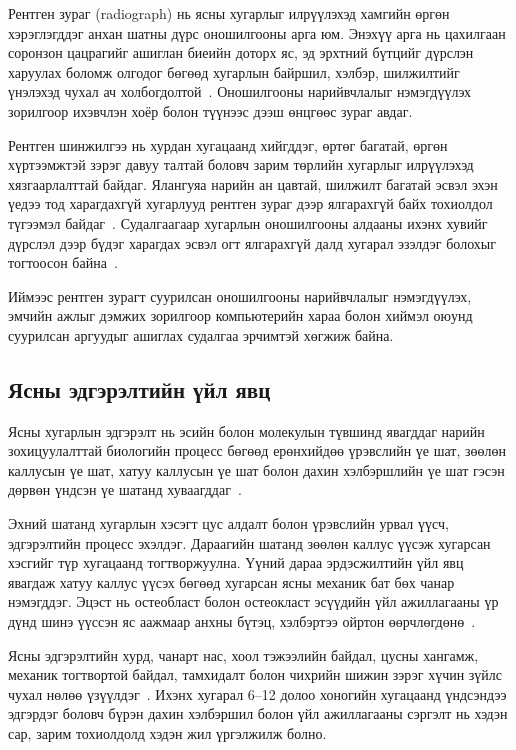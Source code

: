 Рентген зураг (radiograph) нь ясны хугарлыг илрүүлэхэд хамгийн өргөн хэрэглэгддэг анхан шатны дүрс оношилгооны арга юм. Энэхүү арга нь цахилгаан соронзон цацрагийг ашиглан биеийн доторх яс, эд эрхтний бүтцийг дүрслэн харуулах боломж олгодог бөгөөд хугарлын байршил, хэлбэр, шилжилтийг үнэлэхэд чухал ач холбогдолтой~\cite{ref09}. Оношилгооны нарийвчлалыг нэмэгдүүлэх зорилгоор ихэвчлэн хоёр болон түүнээс дээш өнцгөөс зураг авдаг.

Рентген шинжилгээ нь хурдан хугацаанд хийгддэг, өртөг багатай, өргөн хүртээмжтэй зэрэг давуу талтай боловч зарим төрлийн хугарлыг илрүүлэхэд хязгаарлалттай байдаг. Ялангуяа нарийн ан цавтай, шилжилт багатай эсвэл эхэн үедээ тод харагдахгүй хугарлууд рентген зураг дээр ялгарахгүй байх тохиолдол түгээмэл байдаг~\cite{ref10}. Судалгаагаар хугарлын оношилгооны алдааны ихэнх хувийг дүрслэл дээр бүдэг харагдах эсвэл огт ялгарахгүй далд хугарал эзэлдэг болохыг тогтоосон байна~\cite{ref26}.

Иймээс рентген зурагт суурилсан оношилгооны нарийвчлалыг нэмэгдүүлэх, эмчийн ажлыг дэмжих зорилгоор компьютерийн хараа болон хиймэл оюунд суурилсан аргуудыг ашиглах судалгаа эрчимтэй хөгжиж байна.

\subsection*{Ясны эдгэрэлтийн үйл явц}

Ясны хугарлын эдгэрэлт нь эсийн болон молекулын түвшинд явагддаг нарийн зохицуулалттай биологийн процесс бөгөөд ерөнхийдөө үрэвслийн үе шат, зөөлөн каллусын үе шат, хатуу каллусын үе шат болон дахин хэлбэршлийн үе шат гэсэн дөрвөн үндсэн үе шатанд хуваагддаг~\cite{ref27}.

Эхний шатанд хугарлын хэсэгт цус алдалт болон үрэвслийн урвал үүсч, эдгэрэлтийн процесс эхэлдэг. Дараагийн шатанд зөөлөн каллус үүсэж хугарсан хэсгийг түр хугацаанд тогтворжуулна. Үүний дараа эрдэсжилтийн үйл явц явагдаж хатуу каллус үүсэх бөгөөд хугарсан ясны механик бат бөх чанар нэмэгддэг. Эцэст нь остеобласт болон остеокласт эсүүдийн үйл ажиллагааны үр дүнд шинэ үүссэн яс аажмаар анхны бүтэц, хэлбэртээ ойртон өөрчлөгдөнө~\cite{ref27,ref28}.

Ясны эдгэрэлтийн хурд, чанарт нас, хоол тэжээлийн байдал, цусны хангамж, механик тогтвортой байдал, тамхидалт болон чихрийн шижин зэрэг хүчин зүйлс чухал нөлөө үзүүлдэг~\cite{ref29}. Ихэнх хугарал 6--12 долоо хоногийн хугацаанд үндсэндээ эдгэрдэг боловч бүрэн дахин хэлбэршил болон үйл ажиллагааны сэргэлт нь хэдэн сар, зарим тохиолдолд хэдэн жил үргэлжилж болно.

